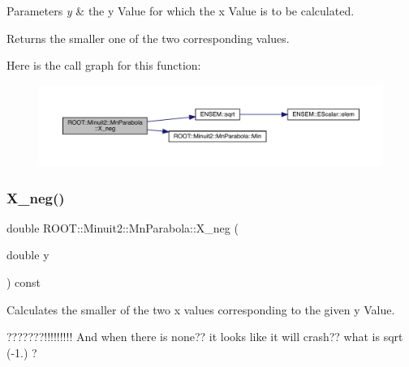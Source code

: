 \begin{DoxyParams}{Parameters}
{\em y} & the y Value for which the x Value is to be calculated.\\
\hline
\end{DoxyParams}
\begin{DoxyReturn}{Returns}
the smaller one of the two corresponding values. 
\end{DoxyReturn}
Here is the call graph for this function\+:
\nopagebreak
\begin{figure}[H]
\begin{center}
\leavevmode
\includegraphics[width=350pt]{db/d7d/classROOT_1_1Minuit2_1_1MnParabola_a16f7f02dd1cb070e89fb007331066ee3_cgraph}
\end{center}
\end{figure}
\mbox{\label{classROOT_1_1Minuit2_1_1MnParabola_a16f7f02dd1cb070e89fb007331066ee3}} 
\subsubsection{\texorpdfstring{X\_neg()}{X\_neg()}\hspace{0.1cm}{\footnotesize\ttfamily [2/3]}}
{\footnotesize\ttfamily double R\+O\+O\+T\+::\+Minuit2\+::\+Mn\+Parabola\+::\+X\+\_\+neg (\begin{DoxyParamCaption}\item[{double}]{y }\end{DoxyParamCaption}) const\hspace{0.3cm}{\ttfamily [inline]}}

Calculates the smaller of the two x values corresponding to the given y Value.

???????!!!!!!!!! And when there is none?? it looks like it will crash?? what is sqrt (-\/1.) ?


